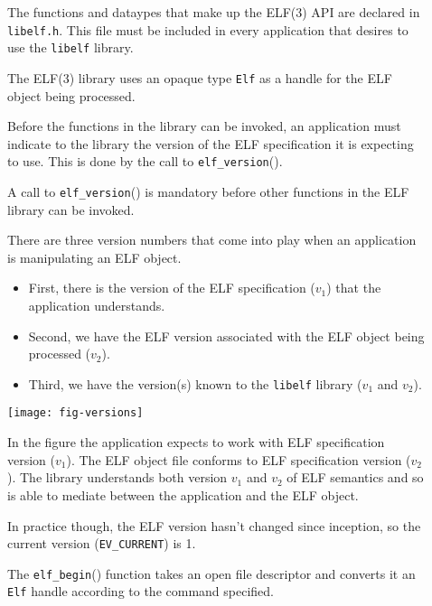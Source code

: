 \documentclass[a4paper]{report}
\newcommand{\function}[1]{\texttt{#1}()}
\newcommand{\library}[1]{\texttt{#1}}
\newcommand{\constant}[1]{\texttt{#1}}
\newcommand{\filename}[1]{\texttt{#1}}
\newcommand{\type}[1]{\texttt{#1}}
\newcommand{\co}[1]{\framebox{\textbf{\color{blue}#1}}}
\begin{document}
\begin{description}
  \item[\co{1}] The functions and dataypes that make up the ELF(3) API
    are declared in \filename{libelf.h}.  This file must be included
    in every application that desires to use the \library{libelf}
    library.

  \item[\co{2}] The ELF(3) library uses an opaque type \type{Elf} as a
    handle for the ELF object being processed.

  \item[\co{4}] Before the functions in the library can be invoked, an
    application must indicate to the library the version of the ELF
    specification it is expecting to use.  This is done by the call to
    \function{elf\_version}.

    A call to \function{elf\_version} is mandatory before other
    functions in the ELF library can be invoked.

    There are three version numbers that come into play when an
    application is manipulating an ELF object.

    \begin{itemize}
    \item First, there is the version of the ELF specification ($v_1$)
      that the application understands.
    \item Second, we have the ELF version associated with the ELF
      object being processed ($v_2$).
    \item Third, we have the version(s) known to the \library{libelf}
      library ($v_1$ and $v_2$).
    \end{itemize}

    \label{fig.versions} \texttt{[image: fig-versions]}

    In the figure  the application expects to
    work with ELF specification version ($v_1$). The ELF object file
    conforms to ELF specification version ($v_2$).  The library
    understands both version $v_1$ and $v_2$ of ELF semantics and so
    is able to mediate between the application and the ELF object.

    In practice though, the ELF version hasn't changed since
    inception, so the current version (\constant{EV\_CURRENT}) is 1.

  \item[\co{5}] The \function{elf\_begin} function takes an open file
    descriptor and converts it an \type{Elf} handle according to the
    command specified.


\end{description}
\end{document}

